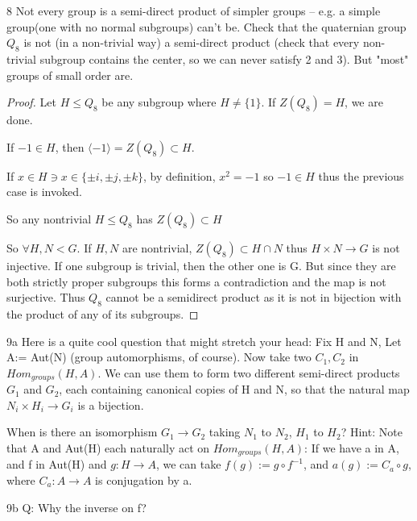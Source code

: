 \documentclass{article}
\begin{document}
\bigskip

\begin{PROB}{8}\label{Problem 8.}
    Not every group is a semi-direct product of simpler groups -- e.g. a simple group(one with no normal subgroups) can't be. Check that the quaternian group $Q_8$ is not (in a non-trivial way) a semi-direct product (check that every non-trivial subgroup contains the center, so we can never satisfy 2 and 3).  But "most" groups of small order are. 
\end{PROB}
\begin{proof}
    Let $H \leq Q_8$ be any subgroup where $H \neq \{1\}$. If $Z(Q_8) = H$, we are done. 

    If $-1 \in H$, then $\langle -1 \rangle = Z(Q_8) \subset H$.
    
    If $x \in H \ni x \in \{\pm i, \pm j, \pm k\}$, by definition, $x^2 = -1$ so $-1 \in H$ thus the previous case is invoked.

    So any nontrivial $H \leq Q_8$ has $Z(Q_8) \subset H$

    So $\forall H, N < G$. If $H, N$ are nontrivial, $Z(Q_8) \subset H \cap N$ thus $H \times N \to G$ is not injective. If one subgroup is trivial, then the other one is G. But since they are both strictly proper subgroups this forms a contradiction and the map is not surjective. Thus $Q_8$ cannot be a semidirect product as it is not in bijection with the product of any of its subgroups.
\end{proof}

\bigskip

\begin{PROB}{9a}\label{Problem 9a.}
    Here is a quite cool question that might stretch your head: Fix H and N, Let A:= Aut(N) (group automorphisms, of course). Now take two  $C_1, C_2$ in $Hom_{groups}(H,A)$. We can use them to form two different semi-direct products $G_1$ and $G_2$, each containing canonical copies of H and N, so that the natural map  $N_i \times H_i \to G_i$ is a bijection. 
    
    When is there an isomorphism $G_1 \to G_2$ taking $N_1$ to $N_2$, $H_1$ to $H_2$? Hint:  Note that A and Aut(H) each naturally act on $Hom_{groups}(H,A)$: If we have a in A, and f in Aut(H) and $g : H \to A$, we can take $f(g) := g \circ f^{-1}$, and $a(g) := C_a \circ g$, where $C_a: A \to A$ is conjugation by a.   
\end{PROB}

\begin{PROB}{9b}\label{Problem 9b.}
    Q: Why the inverse on f? 
\end{PROB}
\end{document}

